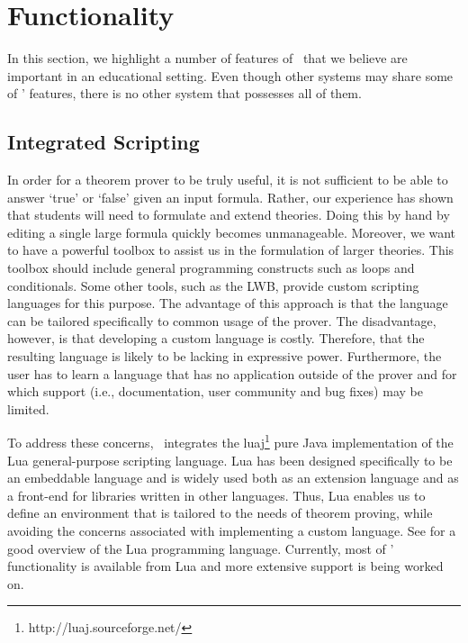 \section{Functionality}
\label{sec:features}

In this section, we highlight a number of features of \oops\ that we believe
are important in an educational setting. Even though other systems may share
some of \oops' features, there is no other system that possesses all of them.

\subsection{Integrated Scripting}

In order for a theorem prover to be truly useful, it is not sufficient to be
able to answer `true' or `false' given an input formula. Rather, our
experience has shown that students will need to formulate and extend theories.
Doing this by hand by editing a single large formula quickly becomes
unmanageable.
Moreover, we want to have a powerful toolbox to assist us in the formulation
of larger theories.
This toolbox should include general programming constructs such as
loops and conditionals. Some other tools, such as the LWB, provide custom
scripting languages for this purpose. The advantage of this approach is that
the language can be tailored specifically to common usage of the prover. The
disadvantage, however, is that developing a custom language is costly.
Therefore, that the resulting language is likely to be lacking in expressive
power.
Furthermore, the user has to learn a language that has no application outside
of the prover and for which support (i.e., documentation, user community and
bug fixes) may be limited.

To address these concerns, \oops\ integrates the
luaj\footnote{http://luaj.sourceforge.net/} pure Java implementation of the Lua
general-purpose scripting language.
Lua has been designed specifically to be an embeddable language and is widely
used both as an extension language and as a front-end for libraries written in
other languages.
Thus, Lua enables us to define an environment that is tailored to the needs of
theorem proving, while avoiding the concerns associated with implementing a
custom language.
See \citet{ierusalimschy2006} for a good overview of the Lua programming
language.
Currently, most of \oops' functionality is available from Lua and more
extensive support is being worked on.

